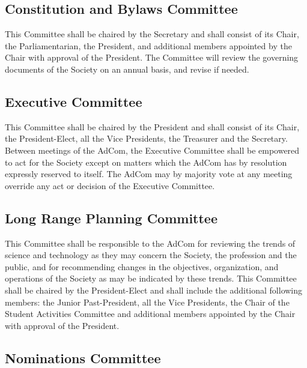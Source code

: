 \documentclass[10pt]{article}
\begin{document}
\subsection{Constitution and Bylaws Committee}

This Committee shall be chaired by the Secretary and shall consist of its Chair, the Parliamentarian, the President, and additional members appointed by the Chair with approval of the President. The Committee will review the governing documents of the Society on an annual basis, and revise if needed.

\subsection{Executive Committee}

This Committee shall be chaired by the President and shall consist of its Chair, the President-Elect, all the Vice Presidents, the Treasurer and the Secretary. Between meetings of the AdCom, the Executive Committee shall be empowered to act for the Society except on matters which the AdCom has by resolution expressly reserved to itself.  The AdCom may by majority vote at any meeting override any act or decision of the Executive Committee. 

\subsection{Long Range Planning Committee}

This Committee shall be responsible to the AdCom for reviewing the trends of science and technology as they may concern the Society, the profession and the public, and for recommending changes in the objectives, organization, and operations of the Society as may be indicated by these trends. This Committee shall be chaired by the President-Elect and shall include the additional following members: the Junior Past-President, all the Vice Presidents, the Chair of the Student Activities Committee and additional members appointed by the Chair with approval of the President.

\subsection{Nominations Committee}
\end{document}
